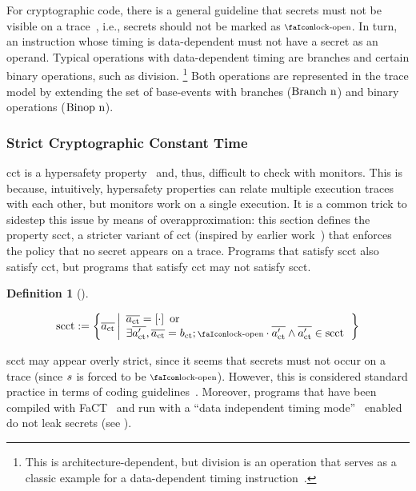 \documentclass[acmsmall]{acmart}
\theoremstyle{definition}
\newtheorem{definition}{Definition}[section]
\begin{document}
For cryptographic code, there is a general guideline that secrets must not be visible on a trace~\cite{ctguidelines}, i.e., secrets should not be marked as $\unlock$.
In turn, an instruction whose timing is data-dependent must not have a secret as an operand.
Typical operations with data-dependent timing are branches and certain binary operations, such as division.%
\footnote{
	This is architecture-dependent, but division is an operation that serves as a classic example for a data-dependent timing instruction~\cite[p.~755]{arm-refman}.
}
Both operations are represented in the trace model by extending the set of base-events with branches ($\text{Branch\ n}$) and binary operations ($\text{Binop\ n}$).

\subsubsection{Strict Cryptographic Constant Time}

\gls*{cct} is a hypersafety property~\cite{barthe2018sec} and, thus, difficult to check with monitors.
This is because, intuitively, hypersafety properties can relate multiple execution traces with each other, but monitors work on a single execution.
It is a common trick to sidestep this issue by means of overapproximation: this section defines the property \gls*{scct}, a stricter variant of \gls*{cct} (inspired by earlier work~\cite{almeida2017jasmin}) that enforces the policy that no secret appears on a trace.
Programs that satisfy \gls*{scct} also satisfy \gls*{cct}, but programs that satisfy \gls*{cct} may not satisfy \gls*{scct}.

\begin{definition}[]\label{def:trace:scctdef}
  
  \noindent\[
  \scctsafe:=\left\{\trace[_{\ctsafe}] \left|\begin{array}{l}
      \trace[_{\ctsafe}]=\hole{\cdot} \text{ or } \\\exists\trace[_{\ctsafe}'],\trace[_{\ctsafe}]=\preevent[_{\ctsafe}];\unlock\cdot\trace[_{\ctsafe}'] \wedge \trace[_{\ctsafe}']\in\scctsafe
    \end{array}\right.\right\}
  \]
\end{definition}

\gls*{scct} may appear overly strict, since it seems that secrets must not occur on a trace (since $s{}$ is forced to be $\unlock$). 
However, this is considered standard practice in terms of coding guidelines~\cite{ctguidelines}.
Moreover, programs that have been compiled with FaCT~\cite{cauligi2019fact} and run with a ``data independent timing mode''~\cite{arm-refman,intel-refman} enabled do not leak secrets (see ). 
\end{document}
